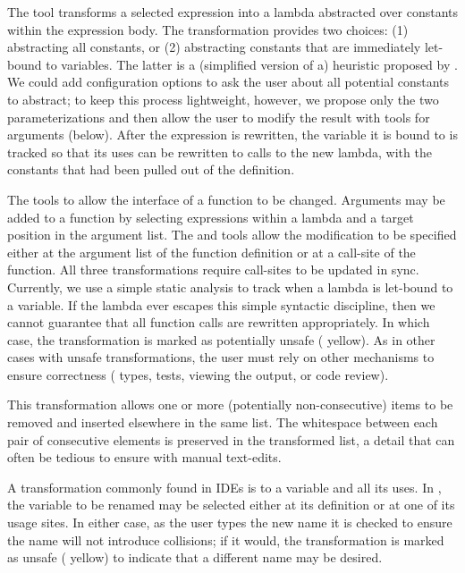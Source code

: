 The 
tool transforms a selected expression into a lambda abstracted
over constants within the expression body. The transformation provides
two choices: (1) abstracting all constants, or (2) abstracting
constants that are immediately let-bound to variables.
The latter is a (simplified version of a) heuristic proposed by
\citet{sns-uist}. We could add configuration options to ask the user about
all potential constants to abstract; to keep this process lightweight,
however, we propose only the two parameterizations and then allow the user to
modify the result with tools for arguments (below).
After the expression is rewritten, the variable it is
bound to is tracked so that its uses can be rewritten to calls to the
new lambda, with the constants that had been pulled out of the
definition.



The tools to  allow the interface of a function to be
changed. Arguments may be added to a function by selecting expressions within a lambda and
a target position in the argument list. The  and  tools allow
the modification to be specified either at the argument list of the function definition or
at a call-site of the function. All three transformations require call-sites to be updated in sync.
Currently, we use a simple
static analysis to track when a lambda is let-bound to a variable.
If the lambda ever escapes this simple syntactic discipline, then we
cannot guarantee that all function calls are rewritten appropriately.
In which case, the transformation is marked as potentially unsafe
(\ie{} yellow). As in other
cases with unsafe transformations, the user must rely on other
mechanisms to ensure correctness (\eg{} types, tests, viewing the output,
or code review).



This transformation allows one or more (potentially non-consecutive)
items to be removed and inserted elsewhere in the same list. The
whitespace between each pair of consecutive elements is preserved in
the transformed list, a detail that can often be tedious to ensure
with manual text-edits.



A transformation commonly found in IDEs
is to  a variable and all its uses. In \deuce{}, the variable to be renamed may
be selected either at
its definition or at one of its usage sites. In either case, as the user
types the new name it is checked to ensure the name will not introduce
collisions; if it would, the transformation is marked as
unsafe (\ie{} yellow) to indicate that a different name may be desired.


